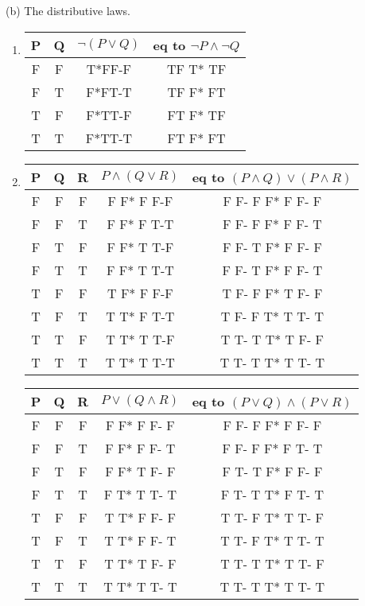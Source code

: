 \documentclass{article}
\begin{document}
(b) The distributive laws.
\begin{enumerate}[label=(\alph*)]
  \item 
\begin{center}
 \begin{tabular}{||c c c c ||} 
 \hline
 P & Q & $\neg( P \lor Q)$ & eq to $\neg P \land \neg Q$ \\ [0.5ex] 
 \hline\hline
 F & F & T*FF-F & TF T* TF\\ 
 \hline
 F & T & F*FT-T & TF F* FT\\
 \hline
 T & F & F*TT-F & FT F* TF\\
 \hline
 T & T & F*TT-T & FT F* FT\\ [1ex] 
 \hline
\end{tabular}
\end{center}
\item
\begin{center}
 \begin{tabular}{||c c c c c||} 
 \hline
 P & Q & R & $P \land (Q \lor R)$ & eq to $(P \land Q) \lor (P \land R)$ \\ [0.5ex] 
 \hline\hline
 F & F & F & F F* F F-F & F F- F F* F F- F\\ 
 \hline
 F & F & T & F F* F T-T & F F- F F* F F- T\\
 \hline
 F & T & F & F F* T T-F & F F- T F* F F- F\\
 \hline
 F & T & T & F F* T T-T & F F- T F* F F- T\\
 \hline
 T & F & F & T F* F F-F & T F- F F* T F- F\\
 \hline
 T & F & T & T T* F T-T & T F- F T* T T- T\\
 \hline
 T & T & F & T T* T T-F & T T- T T* T F- F\\
 \hline
 T & T & T & T T* T T-T & T T- T T* T T- T\\[1ex] 
 \hline
\end{tabular}
\end{center}
\begin{center}
 \begin{tabular}{||c c c c c||} 
 \hline
 P & Q & R & $P \lor (Q \land R)$ & eq to $(P \lor Q) \land (P \lor R)$ \\ [0.5ex] 
 \hline\hline
 F & F & F & F F* F F- F & F F- F F* F F- F\\ 
 \hline
 F & F & T & F F* F F- T & F F- F F* F T- T\\
 \hline
 F & T & F & F F* T F- F & F T- T F* F F- F\\
 \hline
 F & T & T & F T* T T- T & F T- T T* F T- T\\
 \hline
 T & F & F & T T* F F- F & T T- F T* T T- F\\
 \hline
 T & F & T & T T* F F- T & T T- F T* T T- T\\
 \hline
 T & T & F & T T* T F- F & T T- T T* T T- F\\
 \hline
 T & T & T & T T* T T- T & T T- T T* T T- T\\[1ex] 
 \hline
\end{tabular}
\end{center}
\end{enumerate}
\end{document}
